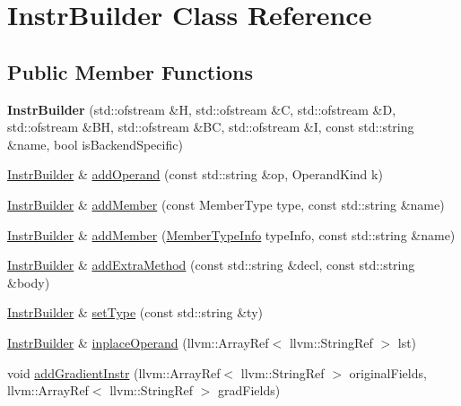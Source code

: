 \hypertarget{class_instr_builder}{}\section{Instr\+Builder Class Reference}
\label{class_instr_builder}
\subsection*{Public Member Functions}
\begin{DoxyCompactItemize}
\item 
\mbox{\label{class_instr_builder_a1f8d2c91448322adb36fdd2f7b039b3a}} 
{\bfseries Instr\+Builder} (std\+::ofstream \&H, std\+::ofstream \&C, std\+::ofstream \&D, std\+::ofstream \&BH, std\+::ofstream \&BC, std\+::ofstream \&I, const std\+::string \&name, bool is\+Backend\+Specific)
\item 
\hyperlink{class_instr_builder}{Instr\+Builder} \& \hyperlink{class_instr_builder_a01a949625decce59e455c45a44ff6dc3}{add\+Operand} (const std\+::string \&op, Operand\+Kind k)
\item 
\hyperlink{class_instr_builder}{Instr\+Builder} \& \hyperlink{class_instr_builder_a528dc2223a85cc13f3daae226dcee417}{add\+Member} (const Member\+Type type, const std\+::string \&name)
\item 
\hyperlink{class_instr_builder}{Instr\+Builder} \& \hyperlink{class_instr_builder_ac19c62ade7850afe2beff82188cb32f5}{add\+Member} (\hyperlink{struct_member_type_info}{Member\+Type\+Info} type\+Info, const std\+::string \&name)
\item 
\hyperlink{class_instr_builder}{Instr\+Builder} \& \hyperlink{class_instr_builder_a77e1fdbb84273840f54d90c540ea2425}{add\+Extra\+Method} (const std\+::string \&decl, const std\+::string \&body)
\item 
\hyperlink{class_instr_builder}{Instr\+Builder} \& \hyperlink{class_instr_builder_a59ba6eb40641a56ed3c7f007c765deaf}{set\+Type} (const std\+::string \&ty)
\item 
\hyperlink{class_instr_builder}{Instr\+Builder} \& \hyperlink{class_instr_builder_aae70d3e15b55b042ad9ebc2b6cffbcfa}{inplace\+Operand} (llvm\+::\+Array\+Ref$<$ llvm\+::\+String\+Ref $>$ lst)
\item 
void \hyperlink{class_instr_builder_af63ba41d5319382fb69e88a41d1703d7}{add\+Gradient\+Instr} (llvm\+::\+Array\+Ref$<$ llvm\+::\+String\+Ref $>$ original\+Fields, llvm\+::\+Array\+Ref$<$ llvm\+::\+String\+Ref $>$ grad\+Fields)

\end{DoxyCompactItemize}
